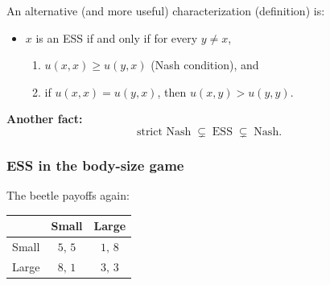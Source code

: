 \documentclass[20pt]{extarticle}
\begin{document}
An alternative (and more useful) characterization (definition) is:
\begin{itemize}
\item $x$ is an ESS if and only if for every $y \neq x$,
	\begin{enumerate}
	\item $u(x,x) \ge u(y,x)$ \qquad (Nash condition), and
	\item if $u(x,x) = u(y,x)$, then $u(x,y) > u(y,y)$.
	\end{enumerate}
%
%
\end{itemize}

\textbf{Another fact:} 
\[ \text{strict Nash} \;\subsetneq\; \text{ESS} \;\subsetneq\; \text{Nash}. \]

\subsubsection*{ESS in the body-size game}

The beetle payoffs again:
\begin{center}
\begin{tabular}{|c||c|c|}
\hline
 & Small & Large \\
\hline\hline
Small & $5,\,5$ & $1,\,8$ \\
\hline
Large & $8,\,1$ & $3,\,3$ \\
\hline
\end{tabular}
\end{center}
\end{document}
